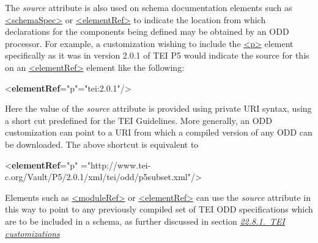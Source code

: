 The {\itshape source} attribute is also used on schema documentation elements such as \hyperref[TEI.schemaSpec]{<schemaSpec>} or \hyperref[TEI.elementRef]{<elementRef>} to indicate the location from which declarations for the components being defined may be obtained by an ODD processor. For example, a customization wishing to include the \hyperref[TEI.p]{<p>} element specifically as it was in version 2.0.1 of TEI P5 would indicate the source for this on an \hyperref[TEI.elementRef]{<elementRef>} element like the following: \par\bgroup{}\exampleFont \begin{shaded}\noindent\mbox{}{<\textbf{elementRef}\hspace*{1em}{key}="{p}"\hspace*{1em}{source}="{tei:2.0.1}"/>}\end{shaded}\egroup\par \noindent  Here the value of the {\itshape source} attribute is provided using private URI syntax, using a short cut predefined for the TEI Guidelines. More generally, an ODD customization can point to a URI from which a compiled version of any ODD can be downloaded. The above shortcut is equivalent to \par\bgroup{}\exampleFont \begin{shaded}\noindent\mbox{}{<\textbf{elementRef}\hspace*{1em}{key}="{p}"\mbox{}\newline 
\hspace*{1em}{source}="{http://www.tei-c.org/Vault/P5/2.0.1/xml/tei/odd/p5subset.xml}"/>}\end{shaded}\egroup\par \noindent  Elements such as \hyperref[TEI.moduleRef]{<moduleRef>} or \hyperref[TEI.elementRef]{<elementRef>} can use the {\itshape source} attribute in this way to point to any previously compiled set of TEI ODD specifications which are to be included in a schema, as further discussed in section \textit{\hyperref[TDbuild]{22.8.1.\ TEI customizations}}\par
